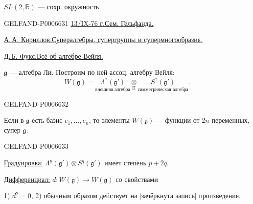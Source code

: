 \(SL(2,\mathbb R)\) --- сохр. окружность.


\begin{GelfandAdjacentEvidence}{GELFAND-P000663}{1}
\underline{13/IX-76 г.}\quad\underline{Сем. Гельфанда.}

\underline{\underline{А.\,А. Кириллов.}}\quad\underline{Супералгебры, супергруппы и супермногообразия.}

\underline{Д.\,Б. Фукс.}\quad\underline{Всё об алгебре Вейля.}

\(\mathfrak g\) --- алгебра Ли. Построим по ней ассоц. алгебру Вейля:
\[
W(\mathfrak g)
=\underset{\text{внешняя алгебра}}{\Lambda^*(\mathfrak g')}
 \underset{\mathrm{II}}{\otimes}
 \underset{\text{симметрическая алгебра}}{S^*(\mathfrak g')}.
\]
\end{GelfandAdjacentEvidence}
\begin{GelfandAdjacentEvidence}{GELFAND-P000663}{2}


Если в \(\mathfrak g\) есть базис \(e_1,\ldots,e_n\), то элементы \(W(\mathfrak g)\) ---
функции от 2\(n\) переменных, супер \(\mathfrak g\).
\end{GelfandAdjacentEvidence}
\begin{GelfandAdjacentEvidence}{GELFAND-P000663}{3}


\underline{Градуировка:} \(\Lambda^p(\mathfrak g')\otimes S^q(\mathfrak g')\)
имеет степень \(p+2q\).

\underline{Дифференциал:} \(d:W(\mathfrak g)\to W(\mathfrak g)\) со свойствами

1) \(d^2=0\), 2) обычным образом действует на [зачёркнута запись] произведение.
\end{GelfandAdjacentEvidence}
